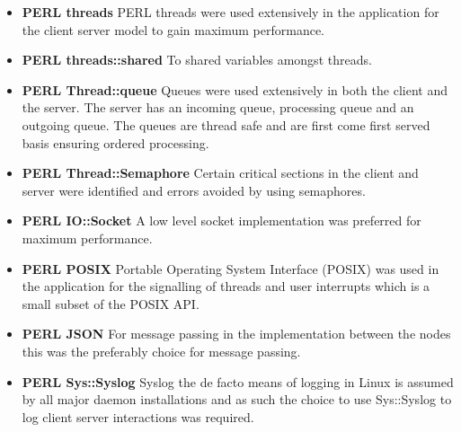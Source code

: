 		\vspace{-5mm}
		\begin{multicols}{2}
			
			\begin{itemize}
			
				\item \textbf{PERL threads}	
					\newline								
					PERL threads were used extensively in the application for the client server model to gain maximum performance.  
				
				\item \textbf{PERL threads::shared}	
					\newline								
					To shared variables amongst threads.
					
				\item \textbf{PERL Thread::queue}	
					\newline								
					Queues were used extensively in both the client and the server.  The server has an incoming queue,
					processing queue and an outgoing queue.  The queues are thread safe and are first come first served basis
					ensuring ordered processing.
					
				\item \textbf{PERL Thread::Semaphore}	
					\newline								
					Certain critical sections in the client and server were identified and errors avoided by using semaphores.
					
				\item \textbf{PERL IO::Socket}	
					\newline								
					A low level socket implementation was preferred for maximum performance.				
					
				\item \textbf{PERL POSIX}	
					\newline								
					Portable Operating System Interface (POSIX) was used in the application for the signalling of 
					threads and user interrupts which is a small subset of the POSIX API.  
							
				\item \textbf{PERL JSON}	
					\newline								
					For message passing in the implementation between the nodes this was the preferably choice for message passing.
				
				\item \textbf{PERL Sys::Syslog}		
					\newline							
					Syslog the de facto means of logging in Linux is assumed by all major daemon installations
					and as such the choice to use Sys::Syslog to log client server interactions was required.
					

\end{itemize}
\end{multicols}
